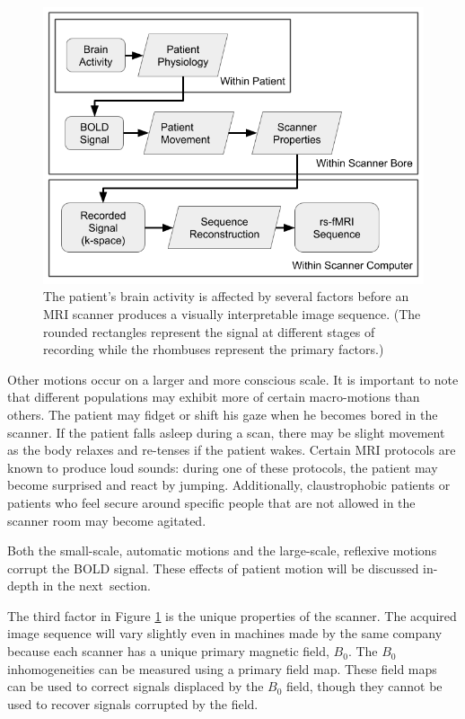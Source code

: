 \begin{figure}
\centering
\includegraphics[width=.72\textwidth]{2/rsfMRI-signal-filters.png}
\caption{The patient's brain activity is affected by several factors before an MRI scanner produces a visually interpretable image sequence. (The rounded rectangles represent the signal at different stages of recording while the rhombuses represent the primary factors.)}
\label{ch2:fig:signal-filters}
\vspace{-30pt}
\end{figure}

Other motions occur on a larger and more conscious scale. It is important to note that different populations may exhibit more of certain macro-motions than others. The patient may fidget or shift his gaze when he becomes bored in the scanner. If the patient falls asleep during a scan, there may be slight movement as the body relaxes and re-tenses if the patient wakes. Certain MRI protocols are known to produce loud sounds: during one of these protocols, the patient may become surprised and react by jumping. Additionally, claustrophobic patients or patients who feel secure around specific people that are not allowed in the scanner room may become agitated. 

Both the small-scale, automatic motions and the large-scale, reflexive motions corrupt the BOLD signal. These effects of patient motion will be discussed in-depth in the next~section.

The third factor in Figure \ref{ch2:fig:signal-filters} is the unique properties of the scanner. The acquired image sequence will vary slightly even in machines made by the same company because each scanner has a unique primary magnetic field, $B_0$. The $B_0$ inhomogeneities can be measured using a primary field map. These field maps can be used to correct signals displaced by the $B_0$ field, though they cannot be used to recover signals corrupted by the field.

